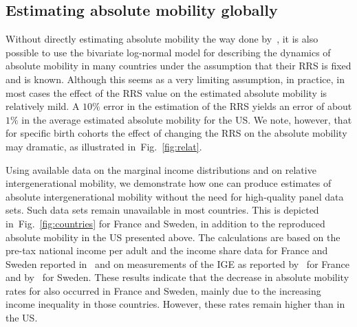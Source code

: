 \documentclass[12pt]{article}
\newcommand{\fref}[1]{Fig.~\ref{fig:#1}}
\numberwithin{equation}{section}
\begin{document}
\subsection{Estimating absolute mobility globally}

Without directly estimating absolute mobility the way done by~\citet{chetty2017fading}, it is also possible to use the bivariate log-normal model for describing the dynamics of absolute mobility in many countries under the assumption that their RRS is fixed and is known. Although this seems as a very limiting assumption, in practice, in most cases the effect of the RRS value on the estimated absolute mobility is relatively mild. A $10\%$ error in the estimation of the RRS yields an error of about $1\%$ in the average estimated absolute mobility for the US. We note, however, that for specific birth cohorts the effect of changing the RRS on the absolute mobility may dramatic, as illustrated in~\fref{relat}.

Using available data on the marginal income distributions and on relative intergenerational mobility, we demonstrate how one can produce estimates of absolute intergenerational mobility without the need for high-quality panel data sets. Such data sets remain unavailable in most countries. This is depicted in~\fref{countries} for France and Sweden, in addition to the reproduced absolute mobility in the US presented above. The calculations are based on the pre-tax national income per adult and the income share data for France and Sweden reported in~\citet{WID2017} and on measurements of the IGE as reported by~\citet{lefranc2005intergenerational} for France and by~\citet{bjorklund1997intergenerational} for Sweden. These results indicate that the decrease in absolute mobility rates for also occurred in France and Sweden, mainly due to the increasing income inequality in those countries. However, these rates remain higher than in the US.
\end{document}
